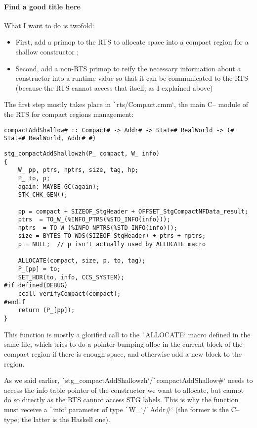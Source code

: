 \documentclass[english]{jflart}
\begin{document}
\paragraph{Find a good title here}

What I want to do is twofold:
\begin{itemize}
\item First, add a primop to the RTS to allocate space into a compact region for a shallow constructor ;
\item Second, add a non-RTS primop to reify the necessary information about a constructor into a runtime-value so that it can be communicated to the RTS (because the RTS cannot access that itself, as I explained above)
\end{itemize}

The first step mostly takes place in \texttt`rts/Compact.cmm`, the main C-- module of the RTS for compact regions management:

\begin{verbatim}
compactAddShallow# :: Compact# -> Addr# -> State# RealWorld -> (# State# RealWorld, Addr# #)
\end{verbatim}
\vspace{-0.6cm}
\begin{verbatim}
stg_compactAddShallowzh(P_ compact, W_ info)
{
    W_ pp, ptrs, nptrs, size, tag, hp;
    P_ to, p;
    again: MAYBE_GC(again);
    STK_CHK_GEN();

    pp = compact + SIZEOF_StgHeader + OFFSET_StgCompactNFData_result;
    ptrs  = TO_W_(%INFO_PTRS(%STD_INFO(info)));
    nptrs  = TO_W_(%INFO_NPTRS(%STD_INFO(info)));
    size = BYTES_TO_WDS(SIZEOF_StgHeader) + ptrs + nptrs;
    p = NULL;  // p isn't actually used by ALLOCATE macro

    ALLOCATE(compact, size, p, to, tag);
    P_[pp] = to;
    SET_HDR(to, info, CCS_SYSTEM);
#if defined(DEBUG)
    ccall verifyCompact(compact);
#endif
    return (P_[pp]);
}
\end{verbatim}

This function is mostly a glorified call to the \texttt`ALLOCATE` macro defined in the same file, which tries to do a pointer-bumping alloc in the current block of the compact region if there is enough space, and otherwise add a new block to the region.

As we said earlier, \texttt`stg_compactAddShallowzh`/\texttt`compactAddShallow#` needs to access the info table pointer of the constructor we want to allocate, but cannot do so directly as the RTS cannot access STG labels. This is why the function must receive a \texttt`info` parameter of type \texttt`W_`/\texttt`Addr#` (the former is the C-- type; the latter is the Haskell one).
\end{document}
